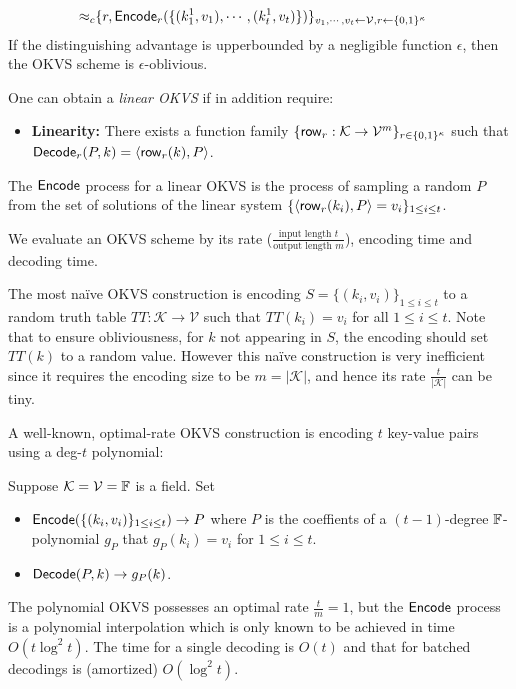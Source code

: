 \begin{definition}
\begin{itemize}
\begin{align*}
    \approx_c &\{r, {\sf Encode}_r(\{(k_1^1,v_1),\cdots,(k_t^1,v_t)\})\}_{v_1,\cdots,v_t\leftarrow \mathcal{V},r\leftarrow\{0,1\}^\kappa}
  \end{align*}
  If the distinguishing advantage is upperbounded by a negligible function $\epsilon$, then the OKVS scheme is $\epsilon$-oblivious. 
  \end{itemize}
One can obtain a \emph{linear OKVS} if in addition require:
\begin{itemize}
  \item \textbf{Linearity: }There exists a function family $\{{\sf row}_r:\mathcal{K}\rightarrow\mathcal{V}^m\}_{r\in\{0,1\}^\kappa}$ such that ${\sf Decode}_r(P,k) = \langle {\sf row}_r(k), P \rangle$. 
\end{itemize}
\end{definition}
The ${\sf Encode}$ process for a linear OKVS is the process of sampling a random $P$ from the set of solutions of the linear system $\{\langle {\sf row}_r(k_i), P \rangle = v_i\}_{1\le i\le t}$. 

We evaluate an OKVS scheme by its rate ($\frac{\text{input length }t}{\text{output length }m}$), encoding time and decoding time. 

The most na\"ive OKVS construction is encoding $S = \{(k_i, v_i)\}_{1\le i\le t}$ to a random truth table $TT:\mathcal{K}\rightarrow \mathcal{V}$ such that $TT(k_i) = v_i$ for all $1\le i\le t$. Note that to ensure obliviousness, for $k$ not appearing in $S$, the encoding should set $TT(k)$ to a random value. However this na\"ive construction is very inefficient since it requires the encoding size to be $m=|\mathcal{K}|$, and hence its rate $\frac{t}{|\mathcal{K}|}$ can be tiny. 

A well-known, optimal-rate OKVS construction is encoding $t$ key-value pairs using a deg-$t$ polynomial: 
\begin{construction}[Polynomial]\label{con:OKVS_polynomial}
  Suppose $\mathcal{K} = \mathcal{V}=\mathbb{F}$ is a field. Set 
  \begin{itemize}
    \item ${\sf Encode}(\{(k_i,v_i)\}_{1\le i\le t}) \rightarrow P$ where $P$ is the coeffients of a $(t-1)$-degree $\mathbb{F}$-polynomial $g_P$ that $g_P(k_i) = v_i$ for $1\le i\le t$. 
    \item ${\sf Decode}(P,k)\rightarrow g_P(k)$. 
  \end{itemize}
\end{construction}
The polynomial OKVS possesses an optimal rate $\frac{t}{m}=1$, but the ${\sf Encode}$ process is a polynomial interpolation which is only known to be achieved in time $O(t\log^2t)$. The time for a single decoding is $O(t)$ and that for batched decodings is (amortized) $O(\log^2 t)$. 


